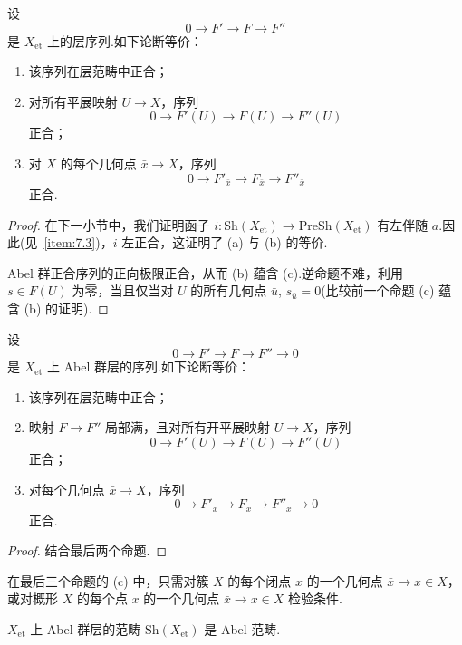 \begin{proposition}\label{prop:7.5}
设
\[
0 \to F' \to F \to F''
\]
是 $X_{\mathrm{et}}$ 上的层序列.如下论断等价：
\begin{enumerate}
  \item 该序列在层范畴中正合；
  \item 对所有平展映射 $U \to X$，序列
  \[
  0 \to F'(U) \to F(U) \to F''(U)
  \]
  正合；
  \item 对 $X$ 的每个几何点 $\bar{x} \to X$，序列
  \[
  0 \to F'_{\bar{x}} \to F_{\bar{x}} \to F''_{\bar{x}}
  \]
  正合.
\end{enumerate}
\end{proposition}

\begin{proof}
在下一小节中，我们证明函子 $i \colon \mathrm{Sh}(X_{\mathrm{et}}) \to \mathrm{PreSh}(X_{\mathrm{et}})$ 有左伴随 $a$.因此(见~\ref{item:7.3})，$i$ 左正合，这证明了 (a) 与 (b) 的等价.

Abel 群正合序列的正向极限正合，从而 (b) 蕴含 (c).逆命题不难，利用 $s \in F(U)$ 为零，当且仅当对 $U$ 的所有几何点 $\bar{u}$, $s_{\bar{u}} = 0$(比较前一个命题 (c) 蕴含 (b) 的证明).
\end{proof}

\begin{proposition}\label{prop:7.6}
设
\[
0 \to F' \to F \to F'' \to 0
\]
是 $X_{\mathrm{et}}$ 上 Abel 群层的序列.如下论断等价：
\begin{enumerate}
  \item 该序列在层范畴中正合；
  \item 映射 $F \to F''$ 局部满，且对所有开平展映射 $U \to X$，序列
  \[
  0 \to F'(U) \to F(U) \to F''(U)
  \]
  正合；
  \item 对每个几何点 $\bar{x} \to X$，序列
  \[
  0 \to F'_{\bar{x}} \to F_{\bar{x}} \to F''_{\bar{x}} \to 0
  \]
  正合.
\end{enumerate}
\end{proposition}

\begin{proof}
结合最后两个命题.
\end{proof}

\begin{remark}\label{rem:7.7}
在最后三个命题的 (c) 中，只需对簇 $X$ 的每个闭点 $x$ 的一个几何点 $\bar{x} \to x \in X$，或对概形 $X$ 的每个点 $x$ 的一个几何点 $\bar{x} \to x \in X$ 检验条件.
\end{remark}

\begin{proposition}\label{prop:7.8}
$X_{\mathrm{et}}$ 上 Abel 群层的范畴 $\mathrm{Sh}(X_{\mathrm{et}})$ 是 Abel 范畴.
\end{proposition}

